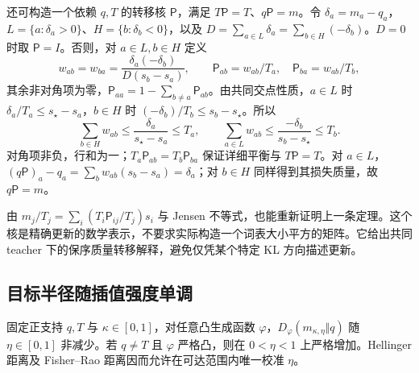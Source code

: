还可构造一个依赖 $q,T$ 的转移核 $\mathsf{P}$，满足 $T \mathsf{P}=T$、$q\mathsf{P}=m$。令 $\delta_a=m_a-q_a$，$L=\{a:\delta_a>0\}$、$H=\{b:\delta_b<0\}$，以及 $D=\sum_{a\in L}\delta_a=\sum_{b\in H}(-\delta_b)$。$D=0$ 时取 $\mathsf{P}=I$。否则，对 $a\in L,b\in H$ 定义
\begin{equation}
 w_{ab}=w_{ba}=\frac{\delta_a(-\delta_b)}{D(s_b-s_a)},\qquad
 \mathsf{P}_{ab}=w_{ab}/T_a,\quad \mathsf{P}_{ba}=w_{ab}/T_b,
\end{equation}
其余非对角项为零，$\mathsf{P}_{aa}=1-\sum_{b\ne a}\mathsf{P}_{ab}$。由共同交点性质，$a\in L$ 时 $\delta_a/T_a\le s_\star-s_a$，$b\in H$ 时 $(-\delta_b)/T_b\le s_b-s_\star$。所以
\begin{equation}
 \sum_{b\in H}w_{ab}\le\frac{\delta_a}{s_\star-s_a}\le T_a,\qquad
 \sum_{a\in L}w_{ab}\le\frac{-\delta_b}{s_b-s_\star}\le T_b.
\end{equation}
对角项非负，行和为一；$T_a\mathsf{P}_{ab}=T_b\mathsf{P}_{ba}$ 保证详细平衡与 $T \mathsf{P}=T$。对 $a\in L$，$(q\mathsf{P})_a-q_a=\sum_b w_{ab}(s_b-s_a)=\delta_a$；对 $b\in H$ 同样得到其损失质量，故 $q\mathsf{P}=m$。

由 $m_j/T_j=\sum_i(T_i\mathsf{P}_{ij}/T_j)s_i$ 与 Jensen 不等式，也能重新证明上一条定理。这个核是精确更新的数学表示，不要求实际构造一个词表大小平方的矩阵。它给出共同 teacher 下的保序质量转移解释，避免仅凭某个特定 KL 方向描述更新。
\subsection{目标半径随插值强度单调}

\begin{theorem}[固定锚点的目标半径单调性]
\label{thm:power-target-radius}
固定正支持 $q,T$ 与 $\kappa\in[0,1]$，对任意凸生成函数 $\varphi$，$D_\varphi(m_{\kappa,\eta}\Vert q)$ 随 $\eta\in[0,1]$ 非减少。若 $q\ne T$ 且 $\varphi$ 严格凸，则在 $0<\eta<1$ 上严格增加。Hellinger 距离及 Fisher--Rao 距离因而允许在可达范围内唯一校准 $\eta$。
\end{theorem}

